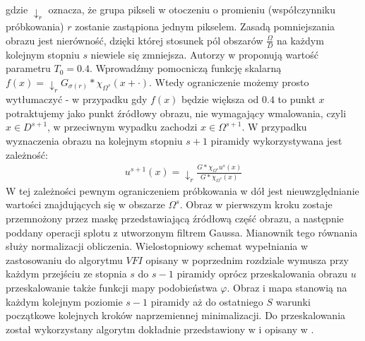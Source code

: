 \documentclass[12pt, twoside, openany]{report}
\theoremstyle{definition}
\begin{document}
gdzie $\downarrow_r$ oznacza, że grupa pikseli w otoczeniu o promieniu (współczynniku próbkowania) $r$ zostanie zastąpiona jednym pikselem. Zasadą pomniejszania obrazu jest nierówność, dzięki której stosunek pól obszarów $\frac{\Omega}{D}$ na każdym kolejnym stopniu $s$ niewiele się zmniejsza. Autorzy w \cite{arias2011variational} proponują wartość parametru $T_0=0.4$. Wprowadźmy pomocniczą funkcję skalarną $f(x) = \downarrow_r G_{\sigma(r)}\ast\chi_{\Omega^s}(x + \cdot)$. Wtedy ograniczenie możemy prosto wytłumaczyć - w przypadku gdy $f(x)$ będzie większa od $0.4$ to punkt $x$ potraktujemy jako punkt źródłowy obrazu, nie wymagający wmalowania, czyli $x \in D^{s+1}$, w przeciwnym wypadku zachodzi $x \in \Omega^{s+1}.$ W przypadku wyznaczenia obrazu na kolejnym stopniu $s+1$ piramidy wykorzystywana jest zależność:
\begin{align}
u^{s+1}(x)= \downarrow_r \frac{G \ast \chi_{\Omega^s} u^s(x)}{G \ast \chi_{\Omega^s}(x)}
\end{align}
W tej zależności pewnym ograniczeniem próbkowania w dół jest nieuwzględnianie wartości znajdujących się w obszarze $\Omega^s$. Obraz w pierwszym kroku zostaje przemnożony przez maskę przedstawiającą źródłową część obrazu, a następnie poddany operacji splotu z utworzonym filtrem Gaussa. Mianownik tego równania służy normalizacji obliczenia. Wielostopniowy schemat wypełniania w zastosowaniu do algorytmu $VFI$ opisany w poprzednim rozdziale wymusza przy każdym przejściu ze stopnia $s$ do $s-1$ piramidy oprócz przeskalowania obrazu $u$ przeskalowanie także funkcji mapy podobieństwa $\varphi$. Obraz i mapa stanowią na każdym kolejnym poziomie $s-1$ piramidy aż do ostatniego $S$ warunki początkowe kolejnych kroków naprzemiennej minimalizacji. Do przeskalowania  został wykorzystany algorytm dokładnie przedstawiony w \cite{wexler2007space} i opisany w \cite{arias2011variational}.
\end{document}
